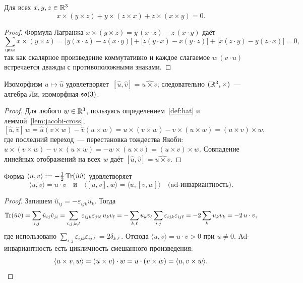 \begin{lemma}\label{lem:jacobi-cross}
Для всех $x, y, z \in \mathbb{R}^3$
\[
  x \times (y \times z) + y \times (z \times x) + z \times (x \times y) = 0 .
\]
\end{lemma}

\begin{proof}
Формула Лагранжа $x\times(y\times z) = y\,(x\cdot z) - z\,(x\cdot y)$
даёт
\[
  \sum_{\text{цикл}} x\times(y\times z)
  = \bigl[y(x\cdot z) - z(x\cdot y)\bigr]
  + \bigl[z(y\cdot x) - x(y\cdot z)\bigr]
  + \bigl[x(z\cdot y) - y(z\cdot x)\bigr] = 0,
\]
так как скалярное произведение коммутативно и каждое слагаемое
$w\,(v\cdot u)$ встречается дважды с противоположными знаками.
\end{proof}

\begin{lemma}\label{lem:hatjacobi}
Изоморфизм $u \mapsto \hat u$ удовлетворяет
$\,[\hat u, \hat v] = \widehat{u \times v}$; следовательно
$(\mathbb{R}^3, \times)$~--- алгебра Ли, изоморфная $\mathfrak{so}(3)$.
\end{lemma}

\begin{proof}
Для любого $w \in \mathbb{R}^3$, пользуясь определением~\ref{def:hat} и
леммой~\ref{lem:jacobi-cross},
\[
  [\hat u,\hat v]\,w = \hat u(v\times w) - \hat v(u \times w)
  = u\times(v\times w) - v\times(u\times w) = (u\times v)\times w,
\]
где последний переход~--- перестановка тождества Якоби:
$u\times(v\times w) - v\times(u\times w)
= -w\times(u\times v) = (u\times v)\times w$.
Совпадение линейных отображений на всех $w$ даёт
$[\hat u,\hat v] = \widehat{u\times v}$.
\end{proof}

\begin{lemma}\label{lem:killing}
Форма
$\langle u, v\rangle := -\tfrac12\operatorname{Tr}(\hat u\hat v)$
удовлетворяет
\[
  \langle u,v\rangle = u\cdot v \quad\text{и}\quad
  \langle [u,v], w\rangle = \langle u, [v,w]\rangle
  \quad\text{(ad-инвариантность).}
\]
\end{lemma}

\begin{proof}
Запишем $\hat u_{ij} = -\varepsilon_{ijk}u_k$. Тогда
\[
  \operatorname{Tr}(\hat u\hat v)
  = \sum_{i,j} \hat u_{ij}\hat v_{ji}
  = \sum_{i,j,k,\ell} \varepsilon_{ijk}\varepsilon_{j i \ell}\,
    u_k v_\ell
  = -\sum_{k,\ell} u_kv_\ell \sum_{i,j}\varepsilon_{ijk}\varepsilon_{ij\ell}
  = -2\sum_{k}u_kv_k = -2\,u\cdot v,
\]
где использовано $\sum_{i,j}\varepsilon_{ijk}\varepsilon_{ij\ell}
= 2\delta_{k\ell}$. Отсюда $\langle u,v\rangle = u\cdot v > 0$ при
$u \ne 0$. Ad-инвариантность есть цикличность смешанного произведения:
\[
  \langle u\times v, w\rangle = (u\times v)\cdot w
  = u\cdot(v\times w) = \langle u, v\times w\rangle. \qedhere
\]
\end{proof}

